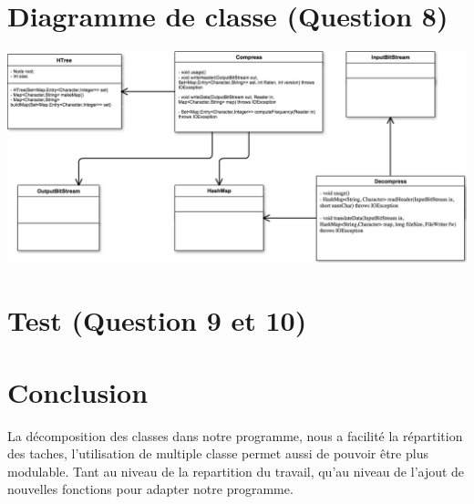 \documentclass[10pt,a4paper]{article}
\begin{document}
\section*{Diagramme de classe (Question 8)}
\begin{center}
    \includegraphics[scale=0.5]{UML.png}
\end{center}

\section*{Test (Question 9 et 10)}

\section*{Conclusion}
La décomposition des classes dans notre programme, nous a facilité la répartition des taches, l'utilisation de multiple classe permet aussi de pouvoir être plus modulable. Tant au niveau de la repartition du travail, qu'au niveau de l'ajout de nouvelles fonctions pour adapter notre programme.\\
\end{document}
